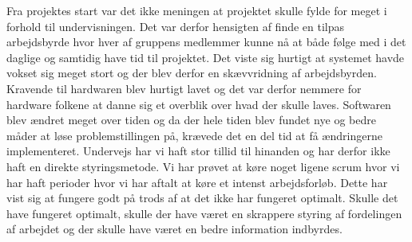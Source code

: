 Fra projektes start var det ikke meningen at projektet skulle fylde for meget i forhold til undervisningen. Det var derfor hensigten af finde en tilpas arbejdsbyrde hvor hver af gruppens medlemmer kunne nå at både følge med i det daglige og samtidig have tid til projektet. Det viste sig hurtigt at systemet havde vokset sig meget stort og der blev derfor en skævvridning af arbejdsbyrden. Kravende til hardwaren blev hurtigt lavet og det var derfor nemmere for hardware folkene at danne sig et overblik over hvad der skulle laves. Softwaren blev ændret meget over tiden og da der hele tiden blev fundet nye og bedre måder at løse problemstillingen på, krævede det en del tid at få ændringerne implementeret. Undervejs har vi haft stor tillid til hinanden og har derfor ikke haft en direkte styringsmetode. Vi har prøvet at køre noget ligene scrum hvor vi har haft perioder hvor vi har aftalt at køre et intenst arbejdsforløb. Dette har vist sig at fungere godt på trods af at det ikke har fungeret optimalt. Skulle det have fungeret optimalt, skulle der have været en skrappere styring af fordelingen af arbejdet og der skulle have været en bedre information indbyrdes.   